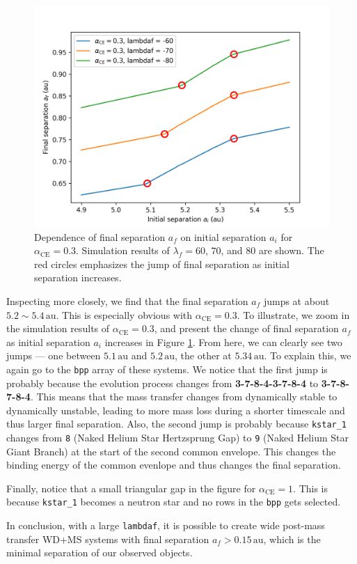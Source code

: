 \documentclass[12pt]{article}
\newcommand{\alphace}{\alpha_{\mathrm{CE}}}
\newcommand{\au}{\, \mathrm{au}}
\begin{document}
\begin{figure}
    \centering
    \includegraphics[width = 0.6\linewidth]{jump-zoom.png}
    \caption{Dependence of final separation $a_f$ on initial separation $a_i$ for $\alphace = 0.3$. Simulation results of $\lambda_f = 60$, $70$, and $80$ are shown. The red circles emphasizes the jump of final separation as initial separation increases.}
    \label{jump-zoom}
\end{figure}

Inspecting more closely, we find that the final separation $a_f$ jumps at about $5.2 \sim 5.4 \au$. This is especially obvious with $\alphace = 0.3$. To illustrate, we zoom in the simulation results of $\alphace = 0.3$, and present the change of final separation $a_f$ as initial separation $a_i$ increases in Figure \ref{jump-zoom}. From here, we can clearly see two jumps — one between $5.1\au$ and $5.2\au$, the other at $5.34\au$. To explain this, we again go to the \verb|bpp| array of these systems. We notice that the first jump is probably because the evolution process changes from \textbf{3-7-8-4-3-7-8-4} to \textbf{3-7-8-7-8-4}. This means that the mass transfer changes from dynamically stable to dynamically unstable, leading to more mass loss during a shorter timescale and thus larger final separation. Also, the second jump is probably because \verb|kstar_1| changes from \verb|8| (Naked Helium Star Hertzsprung Gap) to \verb|9| (Naked Helium Star Giant Branch) at the start of the second common envelope. This changes the binding energy of the common evenlope and thus changes the final separation.

Finally, notice that a small triangular gap in the figure for $\alphace = 1$. This is because \verb|kstar_1| becomes a neutron star and no rows in the \verb|bpp| gets selected.

In conclusion, with a large \verb|lambdaf|, it is possible to create wide post-mass transfer WD+MS systems with final separation $a_f > 0.15 \au$, which is the minimal separation of our observed objects.
\end{document}
